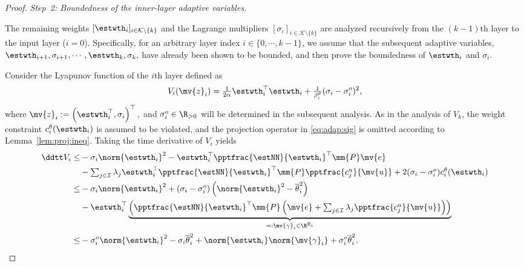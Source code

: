 \documentclass[letterpaper, journal]{IEEEtran}
\begin{document}
\begin{proof}
\hfill

\textit{Step~2: Boundedness of the inner-layer adaptive variables.}

The remaining weights $[\estwth_i]_{i\in\mathcal{K}\setminus\{k\}}$ and the Lagrange multipliers $[\sigma_i]_{i\in\mathcal{K}\setminus\{k\}}$ are analyzed recursively from the $(k-1)$th layer to the input layer ($i=0$). 
Specifically, for an arbitrary layer index $i\in\{0,\cdots,k-1\}$, we assume that the subsequent adaptive variables, $\estwth_{i+1},\sigma_{i+1},\cdots,\estwth_k,\sigma_k,$ have already been shown to be bounded, and then prove the boundedness of $\estwth_i$ and $\sigma_i$.

Consider the Lyapunov function of the $i$th layer defined as
\begin{equation} \label{eq:Vi:def}
  V_{i}(\mv{z}_i)
  =
  \tfrac{1}{2\alpha}\estwth_i^\top\estwth_i
  +
  \tfrac{1}{\beta_i^\theta}(\sigma_i-\sigma_i^o)^2
  ,
\end{equation}
where 
$
  \mv{z}_i:=
  \left(
    \estwth_i^\top,
    \sigma_i
  \right)^\top
  ,
$
and $\sigma_i^o\in\R_{>0}$ will be determined in the subsequent analysis.
As in the analysis of $V_k$, the weight constraint $c_i^{\theta}(\estwth_i)$ is assumed to be violated, and the projection operator in \eqref{eq:adap:sig} is omitted according to Lemma~\ref{lem:proj:ineq}.
Taking the time derivative of $V_i$ yields
\begin{align} \label{eq:Vi:dot:1} 
  \ddtt V_i
  \le&
    -\sigma_i \norm{\estwth_i}^2
    -
    \estwth_i^\top
    {\pptfrac{\estNN}{\estwth_i}}^\top
    \mm{P}
    \mv{e}
  \\ \nonumber
  &
    -
    \textstyle\sum_{j\in\mathcal{I}}
    \lambda_j 
    \estwth_i^\top
    {\pptfrac{\estNN}{\estwth_i}}^\top
    \mm{P}
    \pptfrac{c^{u}_{j}}{\mv{u}}
    +
    2(\sigma_i-\sigma_i^o) c_i^{\theta}(\estwth_i)
  \\ \nonumber
  \le&
    -\sigma_i \norm{\estwth_i}^2
    +
    (\sigma_i-\sigma_i^o) 
    \left(
      \norm{\estwth_i}^2
      -
      \overline{\theta}_i^2
    \right)
  \\ \nonumber
  &
    -
    \estwth_i^\top
    \underbrace{
    \left(
      {\pptfrac{\estNN}{\estwth_i}}^\top
      \mm{P}
      \left(
        \mv{e}
        +
        \textstyle\sum_{j\in\mathcal{I}}
        \lambda_j 
        \pptfrac{c^{u}_{j}}{\mv{u}}
      \right)
    \right)
    }_{=: \mv{\gamma}_i\in\R^{\Xi_i}}
  \\ \nonumber
  \le&
    -\sigma_i^o \norm{\estwth_i}^2
    -\sigma_i \overline{\theta}_i^2
    +
    \norm{\estwth_i}
    \norm{\mv{\gamma}_i}
    +
    \sigma_i^o \overline{\theta}_i^2
  .
\end{align}


\end{proof}
\end{document}
